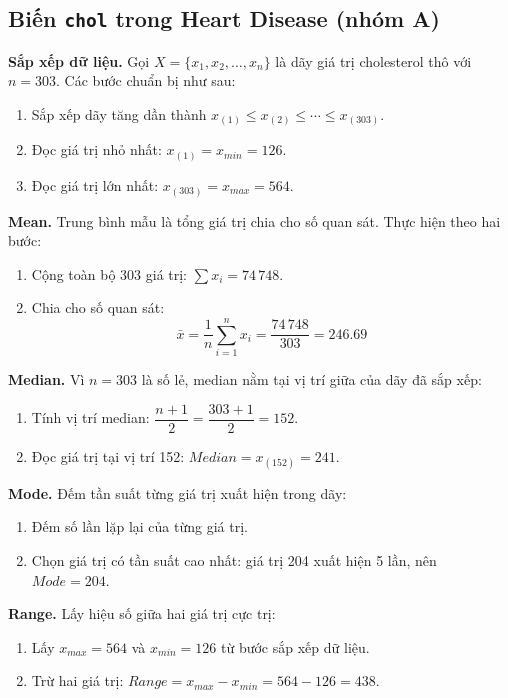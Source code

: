 \subsection{Biến \texttt{chol} trong Heart Disease (nhóm A)}

\noindent\textbf{Sắp xếp dữ liệu.} Gọi $X=\{x_1,x_2,\ldots,x_n\}$ là dãy giá trị cholesterol thô với $n=303$. Các bước chuẩn bị như sau:
\begin{enumerate}[leftmargin=2.2em,label=\textbf{\arabic*.}]
 \item Sắp xếp dãy tăng dần thành $x_{(1)}\le x_{(2)}\le\cdots\le x_{(303)}$.
 \item Đọc giá trị nhỏ nhất: $x_{(1)}=x_{min}=126$.
 \item Đọc giá trị lớn nhất: $x_{(303)}=x_{max}=564$.
\end{enumerate}

\noindent\textbf{Mean.} Trung bình mẫu là tổng giá trị chia cho số quan sát. Thực hiện theo hai bước:
\begin{enumerate}[leftmargin=2.2em,label=\textbf{\arabic*.}]
 \item Cộng toàn bộ 303 giá trị: $\sum x_i = 74\,748$.
 \item Chia cho số quan sát:
 \begin{equation}
 \bar{x} = \frac{1}{n}\sum_{i=1}^{n}x_i = \frac{74\,748}{303} = 246.69
 \end{equation}
\end{enumerate}

\noindent\textbf{Median.} Vì $n=303$ là số lẻ, median nằm tại vị trí giữa của dãy đã sắp xếp:
\begin{enumerate}[leftmargin=2.2em,label=\textbf{\arabic*.}]
 \item Tính vị trí median: $\dfrac{n+1}{2}=\dfrac{303+1}{2}=152$.
 \item Đọc giá trị tại vị trí 152: $Median=x_{(152)}=241$.
\end{enumerate}

\noindent\textbf{Mode.} Đếm tần suất từng giá trị xuất hiện trong dãy:
\begin{enumerate}[leftmargin=2.2em,label=\textbf{\arabic*.}]
 \item Đếm số lần lặp lại của từng giá trị.
 \item Chọn giá trị có tần suất cao nhất: giá trị 204 xuất hiện 5 lần, nên $Mode=204$.
\end{enumerate}

\noindent\textbf{Range.} Lấy hiệu số giữa hai giá trị cực trị:
\begin{enumerate}[leftmargin=2.2em,label=\textbf{\arabic*.}]
 \item Lấy $x_{max}=564$ và $x_{min}=126$ từ bước sắp xếp dữ liệu.
 \item Trừ hai giá trị: $Range = x_{max}-x_{min}=564-126=438$.
\end{enumerate}

